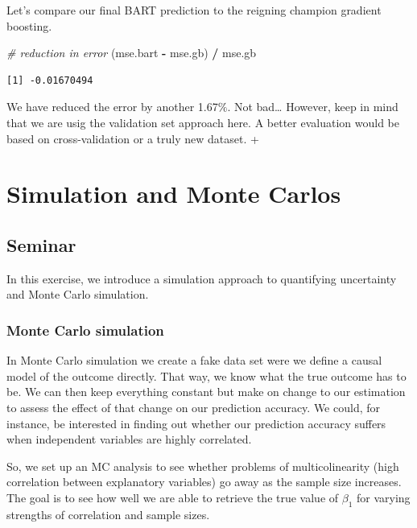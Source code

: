 \documentclass[]{article}
\newenvironment{Shaded}{\begin{snugshade}}{\end{snugshade}}
\newcommand{\CommentTok}[1]{\textcolor[rgb]{0.56,0.35,0.01}{\textit{#1}}}
\newcommand{\NormalTok}[1]{#1}
\newcommand{\OperatorTok}[1]{\textcolor[rgb]{0.81,0.36,0.00}{\textbf{#1}}}
\newcommand{\StringTok}[1]{\textcolor[rgb]{0.31,0.60,0.02}{#1}}
\begin{document}
Let's compare our final BART prediction to the reigning champion gradient boosting.

\begin{Shaded}
\begin{Highlighting}[]
\CommentTok{# reduction in error}
\NormalTok{(mse.bart }\OperatorTok{-}\StringTok{ }\NormalTok{mse.gb) }\OperatorTok{/}\StringTok{ }\NormalTok{mse.gb}
\end{Highlighting}
\end{Shaded}

\begin{verbatim}
[1] -0.01670494
\end{verbatim}

We have reduced the error by another 1.67\(\%\). Not bad\ldots{} However, keep in mind that we are usig the validation set approach here. A better evaluation would be based on cross-validation or a truly new dataset.
+

\hypertarget{simulation-and-monte-carlos}{%
\section{Simulation and Monte Carlos}\label{simulation-and-monte-carlos}}

\hypertarget{seminar-6}{%
\subsection{Seminar}\label{seminar-6}}

In this exercise, we introduce a simulation approach to quantifying uncertainty and Monte Carlo simulation.

\hypertarget{monte-carlo-simulation}{%
\subsubsection{Monte Carlo simulation}\label{monte-carlo-simulation}}

In Monte Carlo simulation we create a fake data set were we define a causal model of the outcome directly. That way, we know what the true outcome has to be. We can then keep everything constant but make on change to our estimation to assess the effect of that change on our prediction accuracy. We could, for instance, be interested in finding out whether our prediction accuracy suffers when independent variables are highly correlated.

So, we set up an MC analysis to see whether problems of multicolinearity (high correlation between explanatory variables) go away as the sample size increases. The goal is to see how well we are able to retrieve the true value of \(\beta_{1}\) for varying strengths of correlation and sample sizes.
\end{document}
